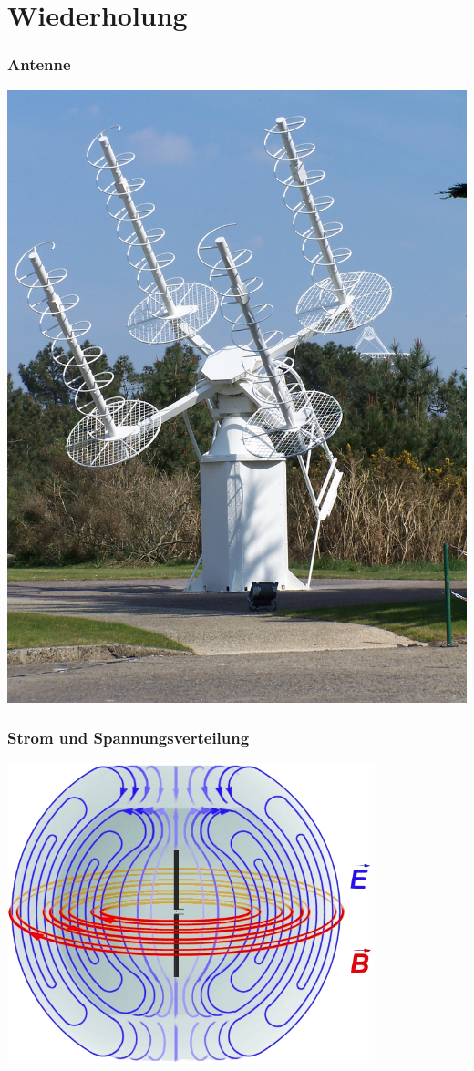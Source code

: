 

\subtitle{Technik A09: \\
  Antennentechnik  \\[2em]}
\date{Stand 01.06.2015}


\section*{Wiederholung}

\begin{frame}
  \frametitle{Antenne}
  \begin{center}
    \includegraphics[width=.6\textwidth]{e11/Traqueur_acquisition.JPG}
    \tiny \hyperlink{refs}{\cite{wm}}
  \end{center}
\end{frame}

\begin{frame}
  \frametitle{Strom und Spannungsverteilung}
  \begin{center}
    \includegraphics[width=0.8\textwidth]{a09/Felder_um_Dipol.png}
    \tiny \hyperlink{refs}{\cite{wm}} \\[1em] \large
  \end{center}
\end{frame}

